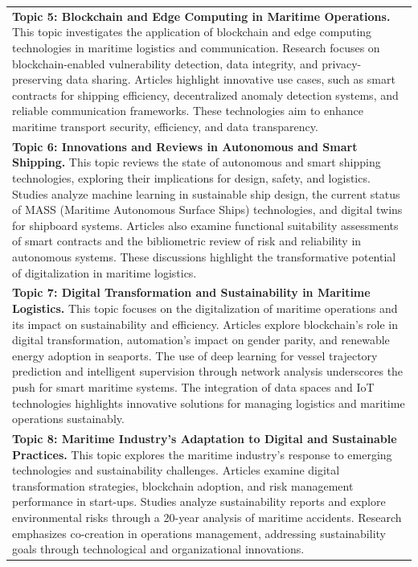 \documentclass[a4paper, review, endfloat, authoryear]{elsarticle}
\begin{document}
\begin{table}[h]
\begin{tabular}{l}
			\textbf{Topic 5: Blockchain and Edge Computing in Maritime Operations.} This topic investigates the application of blockchain and edge computing technologies in maritime logistics and communication. Research focuses on blockchain-enabled vulnerability detection, data integrity, and privacy-preserving data sharing. Articles highlight innovative use cases, such as smart contracts for shipping efficiency, decentralized anomaly detection systems, and reliable communication frameworks. These technologies aim to enhance maritime transport security, efficiency, and data transparency.\\			
			\textbf{Topic 6: Innovations and Reviews in Autonomous and Smart Shipping.} This topic reviews the state of autonomous and smart shipping technologies, exploring their implications for design, safety, and logistics. Studies analyze machine learning in sustainable ship design, the current status of MASS (Maritime Autonomous Surface Ships) technologies, and digital twins for shipboard systems. Articles also examine functional suitability assessments of smart contracts and the bibliometric review of risk and reliability in autonomous systems. These discussions highlight the transformative potential of digitalization in maritime logistics.\\			
			\textbf{Topic 7: Digital Transformation and Sustainability in Maritime Logistics.} This topic focuses on the digitalization of maritime operations and its impact on sustainability and efficiency. Articles explore blockchain’s role in digital transformation, automation's impact on gender parity, and renewable energy adoption in seaports. The use of deep learning for vessel trajectory prediction and intelligent supervision through network analysis underscores the push for smart maritime systems. The integration of data spaces and IoT technologies highlights innovative solutions for managing logistics and maritime operations sustainably.\\			
			\textbf{Topic 8: Maritime Industry’s Adaptation to Digital and Sustainable Practices.} This topic explores the maritime industry's response to emerging technologies and sustainability challenges. Articles examine digital transformation strategies, blockchain adoption, and risk management performance in start-ups. Studies analyze sustainability reports and explore environmental risks through a 20-year analysis of maritime accidents. Research emphasizes co-creation in operations management, addressing sustainability goals through technological and organizational innovations.\\
			\hline
		\end{tabular}
		\label{tab:thematic}
	\end{table}
	
\end{document}
